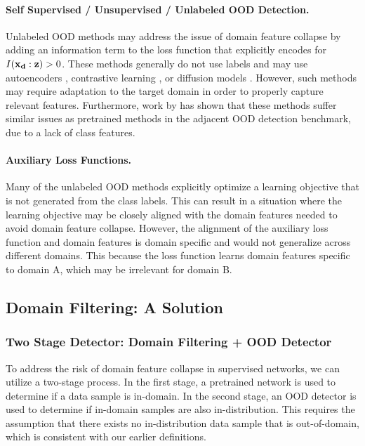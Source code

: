 \documentclass[letterpaper]{article} %
\theoremstyle{plain}
\theoremstyle{definition}
\theoremstyle{remark}
\begin{document}
\paragraph{Self Supervised / Unsupervised / Unlabeled OOD Detection.} Unlabeled OOD methods may address the issue of domain feature collapse by adding an information term to the loss function that explicitly encodes for $I({\mathbf{x}}_{\mathbf{d}}:{\mathbf{z}}) > 0$. These methods generally do not use labels and may use autoencoders \cite{zhou2022rethinking}, contrastive learning \cite{sehwag2021ssd}, or diffusion models \cite{liu2023unsupervised}. However, such methods may require adaptation to the target domain in order to properly capture relevant features. Furthermore, work by \cite{yangcan} has shown that these methods suffer similar issues as pretrained methods in the adjacent OOD detection benchmark, due to a lack of class features.

\paragraph{Auxiliary Loss Functions.} Many of the unlabeled OOD methods explicitly optimize a learning objective that is not generated from the class labels. This can result in a situation where the learning objective may be closely aligned with the domain features needed to avoid domain feature collapse. However, the alignment of the auxiliary loss function and domain features is domain specific and would not generalize across different domains. This because the loss function learns domain features specific to domain A, which may be irrelevant for domain B. 

\subsection{Domain Filtering: A Solution}
\label{sec:domain_filtering}

\subsubsection{Two Stage Detector: Domain Filtering + OOD Detector}

To address the risk of domain feature collapse in supervised networks, we can utilize a two-stage process. In the first stage, a pretrained network is used to determine if a data sample is in-domain. In the second stage, an OOD detector is used to determine if in-domain samples are also in-distribution. This requires the assumption that there exists no in-distribution data sample that is out-of-domain, which is consistent with our earlier definitions.
\end{document}
